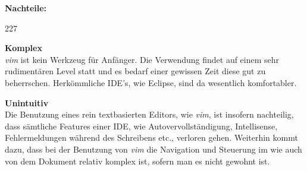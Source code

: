 \textbf{Nachteile:}
\begin{dinglist}{227}
	\item{\textbf{Komplex}}\\
	\textit{vim} ist kein Werkzeug f\"ur Anf\"anger. Die Verwendung findet auf einem sehr rudiment\"aren Level statt und es bedarf einer gewissen Zeit diese gut zu beherrschen. Herk\"ommliche IDE's, wie Eclipse, sind da wesentlich komfortabler.
	\item{\textbf{Unintuitiv}}\\
	Die Benutzung eines rein textbasierten Editors, wie \textit{vim}, ist insofern nachteilig, dass s\"amtliche Features einer IDE, wie Autovervollst\"andigung, Intellisense, Fehlermeldungen w\"ahrend des Schreibens etc., verloren gehen. Weiterhin kommt dazu, dass bei der Benutzung von \textit{vim} die Navigation und Steuerung im wie auch von dem Dokument relativ komplex ist, sofern man es nicht gewohnt ist.
\end{dinglist}

